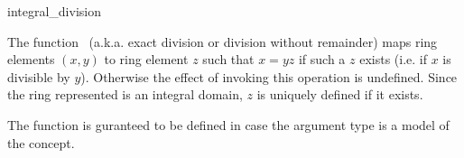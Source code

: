 \begin{ccRefFunction}{integral_division}

\ccDefinition

The function \ccRefName\ (a.k.a. exact division or division without remainder) maps 
ring elements $(x,y)$ to ring element $z$ such that $x = yz$ if such a $z$ 
exists (i.e. if $x$ is divisible by $y$). Otherwise the effect of invoking 
this operation is undefined. Since the ring represented is an integral domain, 
$z$ is uniquely defined if it exists. 

The function is guranteed to be defined in case the argument type 
is a model of the  concept.


{}

\ccSeeAlso

\\
\\

\end{ccRefFunction}

